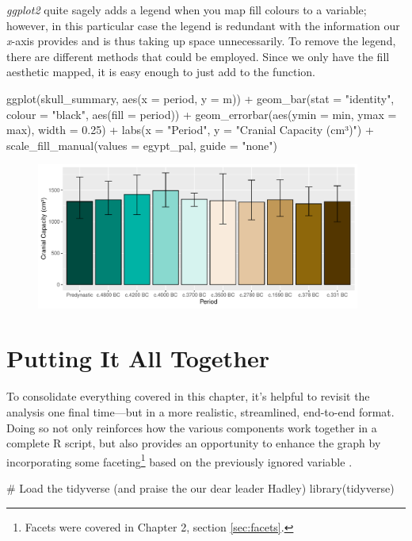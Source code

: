\noindent
\textit{ggplot2} quite sagely adds a legend when you map fill colours to a variable; however, in this particular case the legend is redundant with the information our \textit{x}-axis provides and is thus taking up space unnecessarily. To remove the legend, there are different methods that could be employed. Since we only have the fill aesthetic mapped, it is easy enough to just add  to the  function.

\begin{inRhigh}[highlightlines={5}]
ggplot(skull_summary, aes(x = period, y = m)) +
  geom_bar(stat = "identity", colour = "black", aes(fill = period)) +
  geom_errorbar(aes(ymin = min, ymax = max), width = 0.25) +
  labs(x = "Period", y = "Cranial Capacity (cm³)") +
  scale_fill_manual(values = egypt_pal, guide = "none")
\end{inRhigh}

\vspace{2em}

\begin{figure}[H]
\includegraphics[width = 0.95\textwidth]{graphics/ch3Figs/bar_7.pdf}
\end{figure}

\section{Putting It All Together}

To consolidate everything covered in this chapter, it's helpful to revisit the analysis one final time—but in a more realistic, streamlined, end-to-end format. Doing so not only reinforces how the various components work together in a complete R script, but also provides an opportunity to enhance the graph by incorporating some faceting\footnote{Facets were covered in Chapter 2, section \ref{sec:facets}.} based on the previously ignored variable .

\begin{inR}
# Load the tidyverse (and praise the our dear leader Hadley)
library(tidyverse)
\end{inR}

